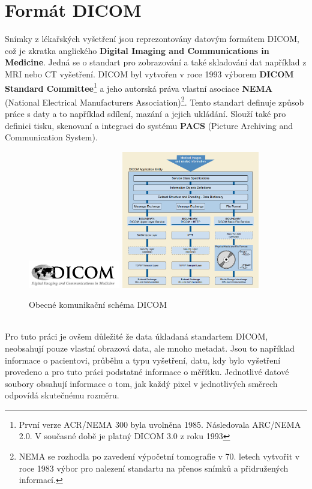 \documentclass{thesis}%
\begin{document}
\chapter{Formát DICOM}
Snímky z lékařských vyšetření jsou reprezontovány datovým formátem DICOM, což je zkratka anglického \textbf{Digital Imaging and Communications in Medicine}. Jedná se o standart pro zobrazování a také skladování dat například z MRI nebo CT vyšetření. DICOM byl vytvořen v roce 1993 výborem \textbf{DICOM Standard Committee}\footnote[7]{První verze ACR/NEMA 300 byla uvolněna 1985. Následovala ARC/NEMA 2.0. V současné době je platný DICOM 3.0 z roku 1993} a jeho autorská práva vlastní asociace  \textbf{NEMA} (National Electrical Manufacturers Association)\footnote[8]{NEMA se rozhodla po zavedení výpočetní tomografie v 70. letech vytvořit v roce 1983 výbor pro nalezení standartu na přenos snímků a přidružených informací.}. Tento standart definuje způsob práce s daty a to například sdílení, mazání a jejich ukládání. Slouží také pro definici tisku, skenovaní a integraci do systému \textbf{PACS} (Picture Archiving and Communication System).
 \begin{figure}[htp!]
  \centering
	\includegraphics[width=4cm]{dicom.jpg}
	\includegraphics[width=6cm]{dicom_genmod.png}
	\caption[DICOM]{Obecné komunikační schéma DICOM}
\end{figure}
\null\\
Pro tuto práci je ovšem důležité že data úkladaná standartem DICOM, neobsahují pouze vlastní obrazová data, ale mnoho metadat. Jsou to například informace o pacientovi, průběhu a typu vyšetření, datu, kdy bylo vyšetření provedeno a pro tuto práci podstatné informace o měřítku. Jednotlivé datové soubory obsahují informace o tom, jak každý pixel v jednotlivých směrech odpovídá skutečnému rozměru.
\end{document}
